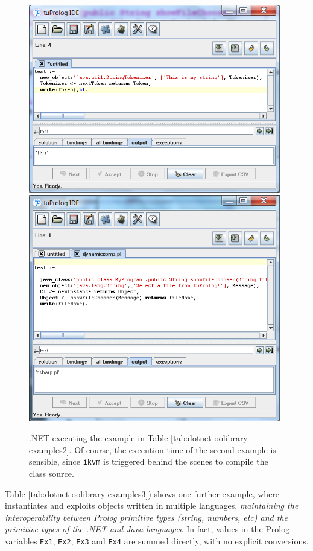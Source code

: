 \begin{figure}
  \centering
  \includegraphics[width=11cm]{images/dotnet-oolibrary-using-StringTokenizer.png}
  \includegraphics[width=11cm]{images/dotnet-oolibrary-dynamiccompilation.png}
  \caption{\tuprolog{}.NET executing the example in Table \ref{tab:dotnet-oolibrary-examples2}. Of course, the execution time of the second example is sensible, since \texttt{ikvm} is triggered behind the scenes to compile the class source.}\label{fig:dotnet-tokenizer-and-dynamic-compilation}
\end{figure}


Table \ref{tab:dotnet-oolibrary-examples3}) shows one further example, where \tuprolog{} instantiates and exploits objects written in multiple languages, \textit{maintaining the interoperability between Prolog primitive types (string, numbers, etc) and the primitive types of the .NET and Java languages}.
In fact, values in the Prolog variables \texttt{Ex1}, \texttt{Ex2}, \texttt{Ex3} and \texttt{Ex4} are summed directly, with no explicit conversions.

